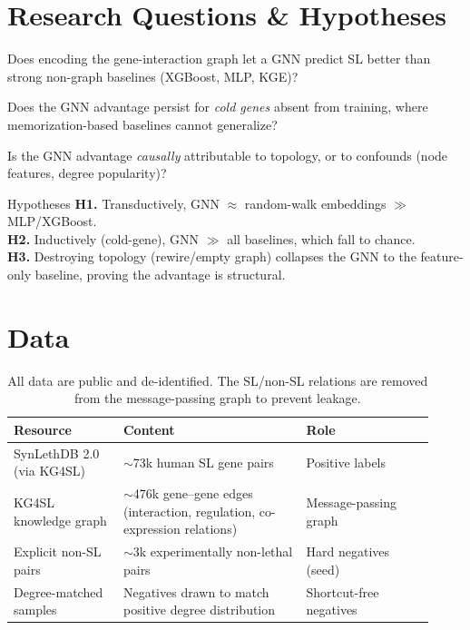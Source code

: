 \documentclass[11pt]{article}
\begin{document}
\section{Research Questions \& Hypotheses}

\begin{description}[leftmargin=1.6em,style=nextline]
\item[RQ1] Does encoding the gene-interaction graph let a GNN predict SL better
than strong non-graph baselines (XGBoost, MLP, KGE)?
\item[RQ2] Does the GNN advantage persist for \emph{cold genes} absent from
training, where memorization-based baselines cannot generalize?
\item[RQ3] Is the GNN advantage \emph{causally} attributable to topology, or to
confounds (node features, degree popularity)?
\end{description}

\begin{hypobox}{Hypotheses}
\textbf{H1.} Transductively, GNN $\approx$ random-walk embeddings $\gg$ MLP/XGBoost.\\
\textbf{H2.} Inductively (cold-gene), GNN $\gg$ all baselines, which fall to chance.\\
\textbf{H3.} Destroying topology (rewire/empty graph) collapses the GNN to the
feature-only baseline, proving the advantage is structural.
\end{hypobox}

\section{Data}

\begin{table}[h]
\centering
\small
\begin{tabular}{>{\raggedright\arraybackslash}p{0.24\linewidth} >{\raggedright\arraybackslash}p{0.40\linewidth} >{\raggedright\arraybackslash}p{0.28\linewidth}}
\toprule
\rowcolor{sriblue}\color{white}\textbf{Resource} & \color{white}\textbf{Content} & \color{white}\textbf{Role}\\
\midrule
\rowcolor{srirow} SynLethDB 2.0 (via KG4SL) & $\sim$73k human SL gene pairs & Positive labels\\
KG4SL knowledge graph & $\sim$476k gene--gene edges (interaction, regulation, co-expression relations) & Message-passing graph\\
\rowcolor{srirow} Explicit non-SL pairs & $\sim$3k experimentally non-lethal pairs & Hard negatives (seed)\\
Degree-matched samples & Negatives drawn to match positive degree distribution & Shortcut-free negatives\\
\bottomrule
\end{tabular}
\caption{All data are public and de-identified. The SL/non-SL relations are
removed from the message-passing graph to prevent leakage.}
\label{tab:data}
\end{table}
\end{document}
